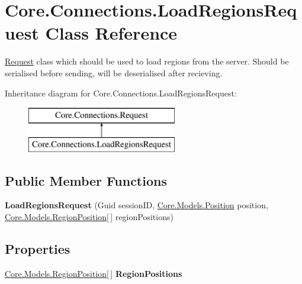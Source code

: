\hypertarget{classCore_1_1Connections_1_1LoadRegionsRequest}{\section{Core.\-Connections.\-Load\-Regions\-Request Class Reference}
\label{classCore_1_1Connections_1_1LoadRegionsRequest}
}


\hyperlink{classCore_1_1Connections_1_1Request}{Request} class which should be used to load regions from the server. Should be serialised before sending, will be deserialised after recieving.  


Inheritance diagram for Core.\-Connections.\-Load\-Regions\-Request\-:\begin{figure}[H]
\begin{center}
\leavevmode
\includegraphics[height=2.000000cm]{classCore_1_1Connections_1_1LoadRegionsRequest}
\end{center}
\end{figure}
\subsection*{Public Member Functions}
\begin{DoxyCompactItemize}
\item 
\hypertarget{classCore_1_1Connections_1_1LoadRegionsRequest_ac0cb2eee50164cbd2449536ecb29956a}{{\bfseries Load\-Regions\-Request} (Guid session\-I\-D, \hyperlink{classCore_1_1Models_1_1Position}{Core.\-Models.\-Position} position, \hyperlink{classCore_1_1Models_1_1RegionPosition}{Core.\-Models.\-Region\-Position}\mbox{[}$\,$\mbox{]} region\-Positions)}\label{classCore_1_1Connections_1_1LoadRegionsRequest_ac0cb2eee50164cbd2449536ecb29956a}

\end{DoxyCompactItemize}
\subsection*{Properties}
\begin{DoxyCompactItemize}
\item 
\hypertarget{classCore_1_1Connections_1_1LoadRegionsRequest_a218b8fc9a7dc007031abe6344dc3dc64}{\hyperlink{classCore_1_1Models_1_1RegionPosition}{Core.\-Models.\-Region\-Position}\mbox{[}$\,$\mbox{]} {\bfseries Region\-Positions}}\label{classCore_1_1Connections_1_1LoadRegionsRequest_a218b8fc9a7dc007031abe6344dc3dc64}

\end{DoxyCompactItemize}
